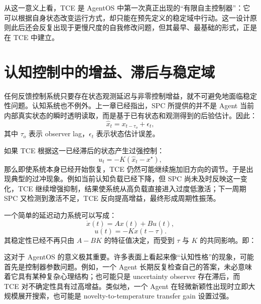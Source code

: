 从这一意义上看，TCE 是 AgentOS 中第一次真正出现的“有限自主控制器”：它可以根据自身状态改变运行方式，却只能在预先定义的稳定域中行动。这一设计原则此后还会反复出现于更慢尺度的自我修改问题，但其最早、最基础的形式，正是在 TCE 中建立。

\section{认知控制中的增益、滞后与稳定域}

任何反馈控制系统只要存在状态观测延迟与非零控制增益，就不可避免地面临稳定性问题。认知系统也不例外。上一章已经指出，SPC 所提供的并不是 Agent 当前内部真实状态的瞬时透明读取，而是基于已有状态和观测得到的后验估计。因此：
\begin{equation}
    \hat x_t
    =
    x_{t-\tau_o}
    +
    \epsilon_t,
\end{equation}
其中 $\tau_o$ 表示 observer lag，$\epsilon_t$ 表示状态估计误差。

如果 TCE 根据这一已经滞后的状态产生过强控制：
\begin{equation}
    u_t
    =
    -K(\hat x_t-x^\star),
\end{equation}
那么即使系统本身已经开始恢复，TCE 仍然可能继续施加旧方向的调节。于是出现典型的过冲现象。例如当前认知负载已经下降，但 SPC 尚未及时反映这一变化，TCE 继续增强抑制，结果使系统从高负载直接进入过度低激活；下一周期 SPC 又检测到激活不足，TCE 反向提高增益，最终形成周期性振荡。

一个简单的延迟动力系统可以写成：
\begin{equation}
    \dot x(t)
    =
    Ax(t)
    +
    Bu(t),
\end{equation}
\begin{equation}
    u(t)
    =
    -Kx(t-\tau).
\end{equation}
其稳定性已经不再只由 $A-BK$ 的特征值决定，而受到 $\tau$ 与 $K$ 的共同影响。即：
\begin{statementbox}
\centering
{}
\end{statementbox}

这对于 AgentOS 的意义极其重要。许多表面上看起来像“认知性格”的现象，可能首先是控制器参数问题。例如，一个 Agent 长期反复检查自己的答案，未必意味着它具有某种复杂心理结构；也可能只是 uncertainty observer 存在滞后，而 TCE 对不确定性具有过高增益。类似地，一个 Agent 在轻微新颖性出现时立即大规模展开搜索，也可能是 novelty-to-temperature transfer gain 设置过强。

